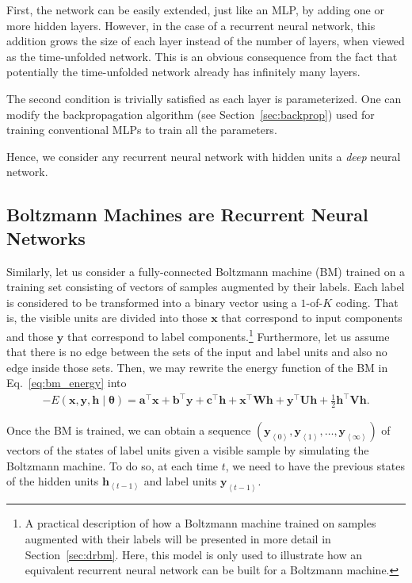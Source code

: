 \documentclass{now}
\newcommand{\qt}[1]{\left<#1\right>}
\newcommand{\vect}[1]{\mathbf{#1}}
\newcommand{\vects}[1]{\boldsymbol{#1}}
\newcommand{\matr}[1]{\mathbf{#1}}
\newcommand{\va}[0]{\vect{a}}
\newcommand{\vb}[0]{\vect{b}}
\newcommand{\vc}[0]{\vect{c}}
\newcommand{\vh}[0]{\vect{h}}
\newcommand{\vx}[0]{\vect{x}}
\newcommand{\vy}[0]{\vect{y}}
\newcommand{\mW}[0]{\matr{W}}
\newcommand{\mU}[0]{\matr{U}}
\newcommand{\mV}[0]{\matr{V}}
\newcommand{\TT}[0]{{\vects{\theta}}}
\begin{document}
First, the network can be easily extended, just like an MLP,
by adding one or more hidden layers. However, in the case of
a recurrent neural network, this addition grows the size of
each layer instead of the number of layers, when viewed as
the time-unfolded network. This is an obvious consequence
from the fact that potentially the time-unfolded network
already has infinitely many layers.

The second condition is trivially satisfied as each layer is
parameterized. One can modify the backpropagation algorithm
(see Section~\ref{sec:backprop}) used for training
conventional MLPs to train all the parameters.

Hence, we consider any recurrent neural network with hidden
units a \textit{deep} neural network. 

\subsection{Boltzmann Machines are Recurrent Neural Networks}

Similarly, let us consider a fully-connected Boltzmann
machine (BM) trained on a training set consisting of vectors
of samples augmented by their labels. Each label is
considered to be transformed into a binary vector using a
$1$-of-$K$ coding.  That is, the visible units are divided
into those $\vx$ that correspond to input components and
those $\vy$ that correspond to label components.\footnote{ 
A practical description of how a
Boltzmann machine trained on samples augmented with their
labels will be presented in more detail in Section~\ref{sec:drbm}.
Here, this model is only used to illustrate how
an equivalent recurrent neural network can be built for a Boltzmann
machine.
}
Furthermore, let us assume that there is no edge between the
sets of the input and label units and also no edge inside
those sets. Then, we may rewrite the energy function of the
BM in Eq.~\eqref{eq:bm_energy} into
\begin{align}
    \label{eq:disbm_energy}
    -E(\vx, \vy, \vh \mid \TT) = \va^\top \vx + \vb^\top \vy
    + \vc^\top \vh + \vx^\top \mW \vh + \vy^\top \mU \vh +
    \frac{1}{2} \vh^\top \mV \vh.
\end{align}

Once the BM is trained, we can obtain a sequence $\left(
\vy_{\qt{0}}, \vy_{\qt{1}}, \dots, \vy_{\qt{\infty}} \right)$ of
vectors of the states of label units given a visible sample
by simulating the Boltzmann machine.  To do so, at each time
$t$, we need to have the previous states of the hidden units
$\vh_{\qt{t-1}}$ and label units $\vy_{\qt{t-1}}$. 
\end{document}
